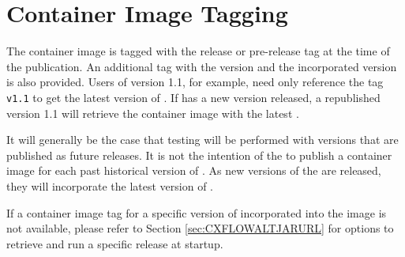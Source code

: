 \section{\cxflowplusplus Container Image Tagging}

The \cxflowplusplus container image is tagged with the \cxtoolkit release or pre-release
tag at the time of the publication.  An additional tag with the \cxtoolkit version
and the incorporated \cxflow version is also provided.  Users of version 1.1,
for example, need only reference the tag \texttt{v1.1} to get the latest version
of \cxflowplusplus.  If \cxflow has a new version released, a republished version 1.1
will retrieve the container image with the latest \cxflow.

It will generally be the case that testing will be performed with \cxflow
versions that are published as future releases.  It is not the intention of the
\cxtoolkit to publish a container image for each past historical version of \cxflow.
As new versions of the \cxtoolkit are released, they will incorporate the latest
version of \cxflow.

If a container image tag for a specific version of \cxflow incorporated into the 
\cxflowplusplus image is not available, please refer to Section \ref{sec:CXFLOWALTJARURL}
for options to retrieve and run a specific \cxflow release at startup.